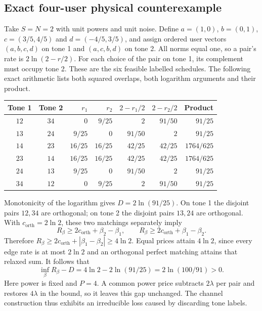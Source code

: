 \documentclass[10pt,letterpaper]{article}
\begin{document}
\subsection{Exact four-user physical counterexample}
Take $S=N=2$ with unit powers and unit noise. Define
$a=(1,0)$, $b=(0,1)$, $c=(3/5,4/5)$ and $d=(-4/5,3/5)$, and assign ordered user vectors $(a,b,c,d)$ on tone 1 and $(a,c,b,d)$ on tone 2. All norms equal one, so a pair's rate is $2\ln(2-r/2)$. For each choice of the pair on tone 1, its complement must occupy tone 2. These are the six feasible labelled schedules. The following exact arithmetic lists both squared overlaps, both logarithm arguments and their product.
\begin{center}
\setlength{\tabcolsep}{7pt}
\begin{tabular}{ccrrrrr}
Tone 1 & Tone 2 & $r_1$ & $r_2$ & $2-r_1/2$ & $2-r_2/2$ & Product\\ \hline
$12$ & $34$ & $0$ & $9/25$ & $2$ & $91/50$ & $91/25$\\
$13$ & $24$ & $9/25$ & $0$ & $91/50$ & $2$ & $91/25$\\
$14$ & $23$ & $16/25$ & $16/25$ & $42/25$ & $42/25$ & $1764/625$\\
$23$ & $14$ & $16/25$ & $16/25$ & $42/25$ & $42/25$ & $1764/625$\\
$24$ & $13$ & $9/25$ & $0$ & $91/50$ & $2$ & $91/25$\\
$34$ & $12$ & $0$ & $9/25$ & $2$ & $91/50$ & $91/25$
\end{tabular}
\end{center}
Monotonicity of the logarithm gives $D=2\ln(91/25)$. On tone 1 the disjoint pairs $12,34$ are orthogonal; on tone 2 the disjoint pairs $13,24$ are orthogonal. With $c_{\mathrm{orth}}=2\ln2$, these two matchings separately imply
\begin{equation}
 R_\beta\ge2c_{\mathrm{orth}}+\beta_2-\beta_1,
 \qquad R_\beta\ge2c_{\mathrm{orth}}+\beta_1-\beta_2.
 \label{supp:four-user-prices}
\end{equation}
Therefore $R_\beta\ge2c_{\mathrm{orth}}+|\beta_1-\beta_2|\ge4\ln2$. Equal prices attain $4\ln2$, since every edge rate is at most $2\ln2$ and an orthogonal perfect matching attains that relaxed sum. It follows that
\begin{equation}
 \inf_\beta R_\beta-D=4\ln2-2\ln(91/25)=2\ln(100/91)>0.
 \label{supp:four-user-gap}
\end{equation}
Here power is fixed and $P=4$. A common power price subtracts $2\lambda$ per pair and restores $4\lambda$ in the bound, so it leaves this gap unchanged. The channel construction thus exhibits an irreducible loss caused by discarding tone labels.
\end{document}
